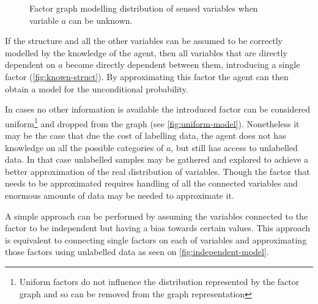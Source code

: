 \begin{figure}[h]
{
}
\caption{\label{fig:known-struct}Factor graph modelling distribution of sensed variables when variable $a$ can be unknown.}
\end{figure}

If the structure and all the other variables can be assumed to be correctly modelled by the
knowledge of the agent, then all variables that are directly dependent on $a$ become directly
dependent between them, introducing a single factor (\autoref{fig:known-struct}).
By approximating this factor the agent can then obtain a model for the unconditional probability.

In cases no other information is available the introduced factor can be considered uniform\footnote{Uniform factors do not influence the
distribution represented by the factor graph and so can be removed from the graph representation}
and dropped from the graph (see \autoref{fig:uniform-model}).
Nonetheless it may be the case that due the cost of labelling data, the agent does not has knowledge
on all the possible categories of $a$, but still has access to unlabelled data.
In that case unlabelled samples may be gathered and explored to achieve a better approximation of
the real distribution of variables.
Though the factor that needs to be approximated requires handling of all the connected variables
and enormous amounts of data may be needed to approximate it.

A simple approach can be performed by assuming the variables connected to the factor to be independent
but having a bias towards certain values. This approach is equivalent to connecting single factors
on each of variables and approximating those factors using unlabelled data as seen on \autoref{fig:independent-model}.


